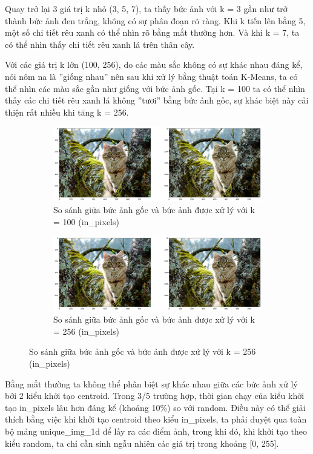 \documentclass{article}
\begin{document}
Quay trở lại 3 giá trị k nhỏ (3, 5, 7), ta thấy bức ảnh với k = 3 gần như trở thành bức ảnh đen trắng, không có sự phân đoạn rõ ràng. Khi k tiến lên bằng 5, một số chi tiết rêu xanh có thể nhìn rõ bằng mắt thường hơn. Và khi k = 7, ta có thể nhìn thấy chi tiết rêu xanh lá trên thân cây. \par

Với các giá trị k lớn (100, 256), do các màu sắc không có sự khác nhau đáng kể, nói nôm na là ''giống nhau'' nên sau khi xử lý bằng thuật toán K-Means, ta có thể nhìn các màu sắc gần như giống với bức ảnh gốc. Tại k = 100 ta có thể nhìn thấy các chi tiết rêu xanh lá không ''tươi'' bằng bức ảnh gốc, sự khác biệt này cải thiện rất nhiều khi tăng k = 256. \par

\begin{figure}[ht!]
  \begin{subfigure}{\textwidth}
    \centering
    \includegraphics[width=\textwidth]{image/com_in_100.png}
    \caption{So sánh giữa bức ảnh gốc và bức ảnh được xử lý với k = 100 (in\_pixels)}
    \label{fig:sfig11}
  \end{subfigure}
  \begin{subfigure}{\textwidth}
    \centering
    \includegraphics[width=\textwidth]{image/com_in_256.png}
    \caption{So sánh giữa bức ảnh gốc và bức ảnh được xử lý với k = 256 (in\_pixels)}
    \label{fig:sfig12}
  \end{subfigure}
  \label{fig:fig5}
\end{figure}

\newpage 
Bằng mẳt thường ta không thể phân biệt sự khác nhau giữa các bức ảnh xử lý bởi 2 kiểu khởi tạo centroid. Trong 3/5 trường hợp, thời gian chạy của kiểu khởi tạo in\_pixels lâu hơn đáng kể (khoảng 10\%) so với random. Điều này có thể giải thích bằng việc khi khởi tạo centroid theo kiểu in\_pixels, ta phải duyệt qua toàn bộ mảng unique\_img\_1d để lấy ra các điểm ảnh, trong khi đó, khi khởi tạo theo kiểu random, ta chỉ cần sinh ngẫu nhiên các giá trị trong khoảng [0, 255]. \par
\end{document}
